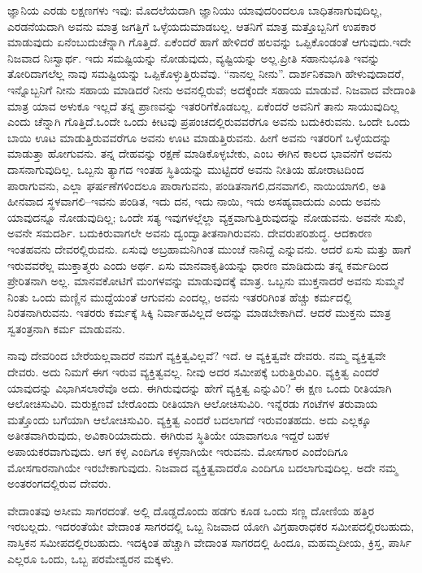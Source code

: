 ಜ್ಞಾನಿಯ ಎರಡು ಲಕ್ಷಣಗಳು ಇವು: ಮೊದಲೆಯದಾಗಿ ಜ್ಞಾನಿಯು ಯಾವುದರಿಂದಲೂ ಬಾಧಿತನಾಗುವುದಿಲ್ಲ, ಎರಡನೆಯದಾಗಿ ಅವನು ಮಾತ್ರ ಜಗತ್ತಿಗೆ ಒಳ್ಳೆಯದು\break ಮಾಡಬಲ್ಲ. ಆತನಿಗೆ ಮಾತ್ರ ಮತ್ತೊಬ್ಬನಿಗೆ ಉಪಕಾರ ಮಾಡುವುದು ಏನೆಂಬುದು\break ಚೆನ್ನಾಗಿ ಗೊತ್ತಿದೆ. ಏಕೆಂದರೆ ಹಾಗೆ ಹೇಳಿದರೆ ಹಲವನ್ನು ಒಪ್ಪಿಕೊಂಡಂತೆ ಆಗುವುದು.\break ಇದೇ ನಿಜವಾದ ನಿಃಸ್ವಾರ್ಥ. ಇದು ಸಮಷ್ಟಿಯನ್ನು ನೋಡುವುದು, ವ್ಯಷ್ಟಿಯನ್ನು ಅಲ್ಲ.\break ಪ್ರೀತಿ ಸಹಾನುಭೂತಿ ಇವನ್ನು ತೋರಿದಾಗಲೆಲ್ಲ ನಾವು ಸಮಷ್ಟಿಯನ್ನು ಒಪ್ಪಿಕೊಳ್ಳು\-ತ್ತಿರುವೆವು. “ನಾನಲ್ಲ ನೀನು”. ದಾರ್ಶನಿಕವಾಗಿ ಹೇಳುವುದಾದರೆ, ಇನ್ನೊಬ್ಬನಿಗೆ ನೀನು ಸಹಾಯ ಮಾಡಿದರೆ ನೀನು ಅವನಲ್ಲಿರುವೆ; ಅದಕ್ಕೆಂದೇ ಸಹಾಯ ಮಾಡುವೆ. ನಿಜವಾದ ವೇದಾಂತಿ ಮಾತ್ರ ಯಾವ ಅಳುಕೂ ಇಲ್ಲದೆ ತನ್ನ ಪ್ರಾಣವನ್ನು ಇತರರಿಗೆ\break ಕೊಡಬಲ್ಲ. ಏಕೆಂದರೆ ಅವನಿಗೆ ತಾನು ಸಾಯುವುದಿಲ್ಲ ಎಂದು ಚೆನ್ನಾಗಿ ಗೊತ್ತಿದೆ.\break ಒಂದೇ ಒಂದು ಕೀಟವು ಪ್ರಪಂಚದಲ್ಲಿರುವವರೆಗೂ ಅವನು ಬದುಕಿರುವನು. ಒಂದೇ ಒಂದು ಬಾಯಿ ಊಟ ಮಾಡುತ್ತಿರುವವರೆಗೂ ಅವನು ಊಟ ಮಾಡುತ್ತಿರುವನು. ಹೀಗೆ ಅವನು ಇತರರಿಗೆ ಒಳ್ಳೆಯದನ್ನು ಮಾಡುತ್ತಾ ಹೋಗುವನು. ತನ್ನ ದೇಹವನ್ನು ರಕ್ಷಣೆ ಮಾಡಿಕೊಳ್ಳಬೇಕು, ಎಂಬ ಈಗಿನ ಕಾಲದ ಭಾವನೆಗೆ ಅವನು ದಾಸನಾಗುವು\-ದಿಲ್ಲ. ಒಬ್ಬನು ತ್ಯಾಗದ ಇಂತಹ ಸ್ಥಿತಿಯನ್ನು ಮುಟ್ಟಿದರೆ ಅವನು ನೀತಿಯ ಹೋರಾಟ\-ದಿಂದ ಪಾರಾಗುವನು, ಎಲ್ಲಾ ಘರ್ಷಣೆಗಳಿಂದಲೂ ಪಾರಾಗುವನು, ಪಂಡಿತನಾಗಲಿ,\break ದನವಾಗಲಿ, ನಾಯಿಯಾಗಲಿ, ಅತಿ ಹೀನವಾದ ಸ್ಥಳವಾಗಲಿ–ಇವನು ಪಂಡಿತ, ಇದು ದನ, ಇದು ನಾಯಿ, ಇದು ಅಸಹ್ಯವಾದುದು ಎಂದು ಅವನು ಯಾವುದನ್ನೂ ನೋಡುವುದಿಲ್ಲ; ಒಂದೇ ಸತ್ಯ ಇವುಗಳಲ್ಲೆಲ್ಲಾ ವ್ಯಕ್ತವಾಗುತ್ತಿರುವುದನ್ನು ನೋಡುವನು. ಅವನೇ ಸುಖಿ, ಅವನೇ ಸಮದರ್ಶಿ. ಬದುಕಿರುವಾಗಲೇ ಅವನು ದ್ವಂದ್ವಾತೀತನಾಗಿರುವನು. ದೇವರು\break ಪರಿಶುದ್ಧ. ಆದಕಾರಣ ಇಂತಹವನು ದೇವರಲ್ಲಿರುವನು. ಏಸುವು ಅಬ್ರಹಾಮನಿಗಿಂತ ಮುಂಚೆ ನಾನಿದ್ದೆ ಎನ್ನುವನು. ಆದರೆ ಏಸು ಮತ್ತು ಹಾಗೆ ಇರುವವರೆಲ್ಲ ಮುಕ್ತಾತ್ಮರು ಎಂದು ಅರ್ಥ. ಏಸು ಮಾನವಾಕೃತಿಯನ್ನು ಧಾರಣ ಮಾಡಿದುದು ತನ್ನ ಕರ್ಮದಿಂದ ಪ್ರೇರಿತನಾಗಿ ಅಲ್ಲ. ಮಾನವಕೋಟಿಗೆ ಮಂಗಳವನ್ನು ಮಾಡುವುದಕ್ಕೆ ಮಾತ್ರ. ಒಬ್ಬನು ಮುಕ್ತನಾದರೆ ಅವನು ಸುಮ್ಮನೆ ನಿಂತು ಒಂದು ಮಣ್ಣಿನ ಮುದ್ದೆಯಂತೆ ಆಗುವನು ಎಂದಲ್ಲ, ಅವನು ಇತರರಿಗಿಂತ ಹೆಚ್ಚು ಕರ್ಮದಲ್ಲಿ ನಿರತನಾಗಿರುವನು. ಇತರರು ಕರ್ಮಕ್ಕೆ ಸಿಕ್ಕಿ ನಿರ್ವಾಹವಿಲ್ಲದೆ ಅದನ್ನು ಮಾಡಬೇಕಾಗಿದೆ. ಆದರೆ ಮುಕ್ತನು ಮಾತ್ರ ಸ್ವತಂತ್ರನಾಗಿ ಕರ್ಮ ಮಾಡುವನು.

ನಾವು ದೇವರಿಂದ ಬೇರೆಯಲ್ಲವಾದರೆ ನಮಗೆ ವ್ಯಕ್ತಿತ್ವವಿಲ್ಲವೆ? ಇದೆ. ಆ ವ್ಯಕ್ತಿತ್ವವೇ ದೇವರು. ನಮ್ಮ ವ್ಯಕ್ತಿತ್ವವೇ ದೇವರು. ಅದು ನಿಮಗೆ ಈಗ ಇರುವ ವ್ಯಕ್ತಿತ್ವವಲ್ಲ. ನೀವು ಅದರ ಸಮೀಪಕ್ಕೆ ಬರುತ್ತಿರುವಿರಿ. ವ್ಯಕ್ತಿತ್ವ ಎಂದರೆ ಯಾವುದನ್ನು ವಿಭಾಗಿಸಲಾರೆವೊ ಅದು. ಈಗಿರುವುದನ್ನು ಹೇಗೆ ವ್ಯಕ್ತಿತ್ವ ಎನ್ನುವಿರಿ? ಈ ಕ್ಷಣ ಒಂದು ರೀತಿಯಾಗಿ ಆಲೋಚಿಸುವಿರಿ. ಮರುಕ್ಷಣವೆ ಬೇರೊಂದು ರೀತಿಯಾಗಿ ಆಲೋಚಿಸುವಿರಿ. ಇನ್ನೆರಡು ಗಂಟೆಗಳ ತರುವಾಯ ಮತ್ತೊಂದು ಬಗೆಯಾಗಿ ಆಲೋಚಿಸುವಿರಿ. ವ್ಯಕ್ತಿತ್ವ ಎಂದರೆ ಬದಲಾಗದೆ ಇರುವಂತಹದು. ಅದು ಎಲ್ಲಕ್ಕೂ ಅತೀತವಾಗಿರುವುದು, ಅವಿಕಾರಿಯಾದುದು. ಈಗಿರುವ ಸ್ಥಿತಿಯೇ ಯಾವಾಗಲೂ ಇದ್ದರೆ ಬಹಳ ಅಪಾಯಕರವಾಗುವುದು. ಆಗ ಕಳ್ಳ ಎಂದಿಗೂ ಕಳ್ಳನಾಗಿಯೇ ಇರುವನು. ಮೋಸಗಾರ ಎಂದೆಂದಿಗೂ ಮೋಸಗಾರನಾಗಿಯೇ ಇರಬೇಕಾಗುವುದು. ನಿಜವಾದ ವ್ಯಕ್ತಿತ್ವವಾದರೊ ಎಂದಿಗೂ ಬದಲಾಗುವುದಿಲ್ಲ. ಅದೇ ನಮ್ಮ ಅಂತರಂಗದಲ್ಲಿರುವ ದೇವರು.

ವೇದಾಂತವು ಅಸೀಮ ಸಾಗರದಂತೆ. ಅಲ್ಲಿ ದೊಡ್ಡದೊಂದು ಹಡಗು ಕೂಡ ಒಂದು ಸಣ್ಣ ದೋಣಿಯ ಹತ್ತಿರ ಇರಬಲ್ಲದು. ಇದರಂತೆಯೇ ವೇದಾಂತ ಸಾಗರದಲ್ಲಿ ಒಬ್ಬ ನಿಜವಾದ ಯೋಗಿ ವಿಗ್ರಹಾರಾಧಕರ ಸಮೀಪದಲ್ಲಿರಬಹುದು, ನಾಸ್ತಿಕನ ಸಮೀಪದಲ್ಲಿರಬಹುದು. ಇದಕ್ಕಿಂತ ಹೆಚ್ಚಾಗಿ ವೇದಾಂತ ಸಾಗರದಲ್ಲಿ ಹಿಂದೂ, ಮಹಮ್ಮದೀಯ, ಕ್ರಿಸ್ತ, ಪಾರ್ಸಿ ಎಲ್ಲರೂ ಒಂದು, ಒಬ್ಬ ಪರಮೇಶ್ವರನ ಮಕ್ಕಳು.

